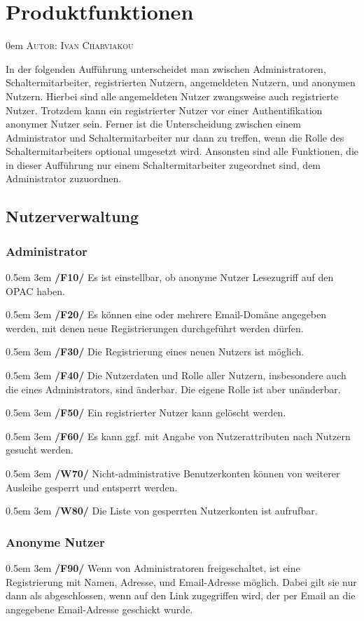 \documentclass{article}
\makeatletter
\newcommand{\sectionauthor}[1]{
	{\parindent 0em \large \scshape Autor: #1 \par \nobreak \vspace*{2em}}
	\@afterheading
}
\newcommand{\specification}[3]{
	{\parindent 0.5em \hangindent 3em \hypertarget{spec:#1:#2}{\textbf{/#1#2/}} #3 \par \nobreak \vspace*{0.5em}}
}
\makeatother
\begin{document}
\newpage

\section{Produktfunktionen} %
\sectionauthor{Ivan Charviakou}
In der folgenden Aufführung unterscheidet man zwischen Administratoren, Schaltermitarbeiter, registrierten Nutzern, angemeldeten Nutzern, und anonymen Nutzern.
Hierbei sind alle angemeldeten Nutzer zwangsweise auch registrierte Nutzer. Trotzdem kann ein registrierter Nutzer vor einer Authentifikation anonymer Nutzer sein.
Ferner ist die Unterscheidung zwischen einem Administrator und Schaltermitarbeiter nur dann zu treffen, wenn die Rolle des Schaltermitarbeiters optional umgesetzt wird.
Ansonsten sind alle Funktionen, die in dieser Aufführung nur einem Schaltermitarbeiter zugeordnet sind, dem Administrator zuzuordnen.
	\subsection{Nutzerverwaltung}
		\subsubsection{Administrator}
			\specification{F}{10}{Es ist einstellbar, ob anonyme Nutzer Lesezugriff auf den OPAC haben.}
			\specification{F}{20}{Es können eine oder mehrere Email-Domäne angegeben werden, mit denen neue Registrierungen durchgeführt werden dürfen.}
			\specification{F}{30}{Die Registrierung eines neuen Nutzers ist möglich.}
			\specification{F}{40}{Die Nutzerdaten und Rolle aller Nutzern, insbesondere auch die eines Administrators, sind änderbar. Die eigene Rolle ist aber unänderbar. }
			\specification{F}{50}{Ein registrierter Nutzer kann gelöscht werden.}
			\specification{F}{60}{Es kann ggf. mit Angabe von Nutzerattributen nach Nutzern gesucht werden.}
			\specification{W}{70}{Nicht-administrative Benutzerkonten können von weiterer Ausleihe gesperrt und entsperrt werden.}
			\specification{W}{80}{Die Liste von gesperrten Nutzerkonten ist aufrufbar.}
		\subsubsection{Anonyme Nutzer}
			\specification{F}{90}{Wenn von Administratoren freigeschaltet, ist eine Registrierung mit Namen, Adresse, und Email-Adresse möglich. 
				Dabei gilt sie nur dann als abgeschlossen, wenn auf den Link zugegriffen wird, der per Email an die angegebene Email-Adresse geschickt wurde. }
\end{document}

